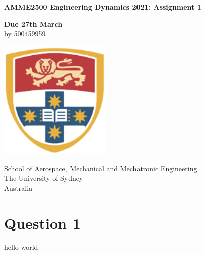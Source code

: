 \documentclass[11]{article}
\begin{document}
\begin{titlepage}
    \begin{center}
        \vspace*{1cm}
            
        \Huge
        \textbf{AMME2500 Engineering Dynamics 2021: Assignment 1}
            
        \vspace{0.5cm}
        \LARGE
        \textbf{Due 27th March} \\
        by 500459959
            
        \vspace{1.5cm}
        
        \large
        \vspace{1cm}
            
        \vfill
            
        \vspace{0.4cm}
            
        \includegraphics[width=0.4\textwidth]{photos/university-of-sydney.png}
            
        \Large
        School of Aerospace, Mechanical and Mechatronic Engineering\\
        The University of Sydney\\
        Australia\\
       
        \newpage
        \tableofcontents %
    \end{center}
\end{titlepage}

\newpage
\large
{}
\section{Question 1}
hello world
\end{document}

